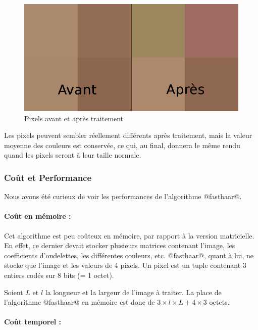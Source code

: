 \documentclass{article}
\begin{document}
\begin{figure}[!h]
\centering
\includegraphics[scale=0.3]{images/aprescompress.jpg}
\caption{Pixels avant et après traitement}
\label{after}
\end{figure}

Les pixels peuvent sembler réellement différents après traitement, mais la valeur moyenne des couleurs est conservée, ce qui, au final, donnera le même rendu quand les pixels seront à leur taille normale.

\clearpage

\subsubsection{Coût et Performance}

Nous avons été curieux de voir les performances de l'algorithme @fasthaar@.

\paragraph{Coût en mémoire :}

Cet algorithme est peu coûteux en mémoire, par rapport à la version matricielle. En effet, ce dernier devait stocker plusieurs matrices contenant l'image, les coefficients d'ondelettes, les différentes couleurs, etc. @fasthaar@, quant à lui, ne stocke que l'image et les valeurs de 4 pixels. Un pixel est un tuple contenant 3 entiers codés sur 8 bits (= 1 octet). 

Soient $L$ et $l$ la longueur et la largeur de l'image à traiter. 
La place de l'algorithme @fasthaar@ en mémoire est donc de $3\times{}l\times{}L + 4 \times{} 3$ octets.

\paragraph{Coût temporel :}
\end{document}

